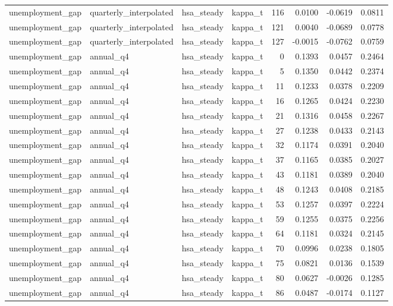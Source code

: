 \begin{tabular}{llllrrrr}
unemployment\_gap & quarterly\_interpolated & hsa\_steady & kappa\_t & 116 & 0.0100 & -0.0619 & 0.0811 \\
unemployment\_gap & quarterly\_interpolated & hsa\_steady & kappa\_t & 121 & 0.0040 & -0.0689 & 0.0778 \\
unemployment\_gap & quarterly\_interpolated & hsa\_steady & kappa\_t & 127 & -0.0015 & -0.0762 & 0.0759 \\
unemployment\_gap & annual\_q4 & hsa\_steady & kappa\_t & 0 & 0.1393 & 0.0457 & 0.2464 \\
unemployment\_gap & annual\_q4 & hsa\_steady & kappa\_t & 5 & 0.1350 & 0.0442 & 0.2374 \\
unemployment\_gap & annual\_q4 & hsa\_steady & kappa\_t & 11 & 0.1233 & 0.0378 & 0.2209 \\
unemployment\_gap & annual\_q4 & hsa\_steady & kappa\_t & 16 & 0.1265 & 0.0424 & 0.2230 \\
unemployment\_gap & annual\_q4 & hsa\_steady & kappa\_t & 21 & 0.1316 & 0.0458 & 0.2267 \\
unemployment\_gap & annual\_q4 & hsa\_steady & kappa\_t & 27 & 0.1238 & 0.0433 & 0.2143 \\
unemployment\_gap & annual\_q4 & hsa\_steady & kappa\_t & 32 & 0.1174 & 0.0391 & 0.2040 \\
unemployment\_gap & annual\_q4 & hsa\_steady & kappa\_t & 37 & 0.1165 & 0.0385 & 0.2027 \\
unemployment\_gap & annual\_q4 & hsa\_steady & kappa\_t & 43 & 0.1181 & 0.0389 & 0.2040 \\
unemployment\_gap & annual\_q4 & hsa\_steady & kappa\_t & 48 & 0.1243 & 0.0408 & 0.2185 \\
unemployment\_gap & annual\_q4 & hsa\_steady & kappa\_t & 53 & 0.1257 & 0.0397 & 0.2224 \\
unemployment\_gap & annual\_q4 & hsa\_steady & kappa\_t & 59 & 0.1255 & 0.0375 & 0.2256 \\
unemployment\_gap & annual\_q4 & hsa\_steady & kappa\_t & 64 & 0.1181 & 0.0324 & 0.2145 \\
unemployment\_gap & annual\_q4 & hsa\_steady & kappa\_t & 70 & 0.0996 & 0.0238 & 0.1805 \\
unemployment\_gap & annual\_q4 & hsa\_steady & kappa\_t & 75 & 0.0821 & 0.0136 & 0.1539 \\
unemployment\_gap & annual\_q4 & hsa\_steady & kappa\_t & 80 & 0.0627 & -0.0026 & 0.1285 \\
unemployment\_gap & annual\_q4 & hsa\_steady & kappa\_t & 86 & 0.0487 & -0.0174 & 0.1127 \\

\end{tabular}
